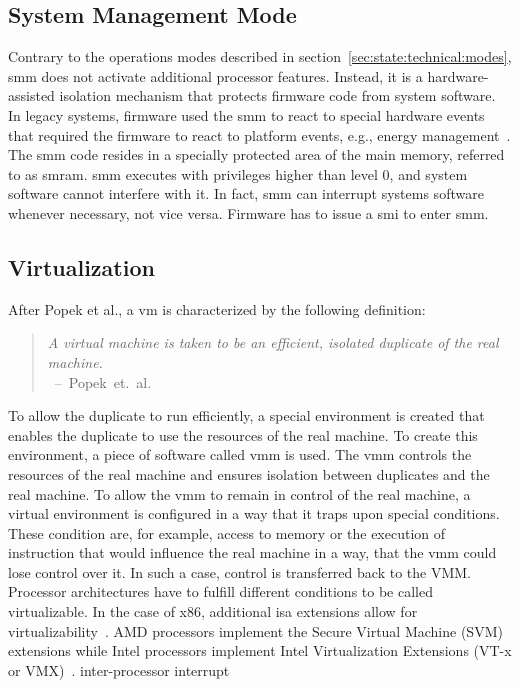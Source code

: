 \subsection{System Management Mode}
\label{sec:state:technical:smm}
Contrary to the operations modes described in
section~\ref{sec:state:technical:modes}, \gls{smm} does not activate additional
processor features. Instead, it is a hardware-assisted isolation mechanism that
protects firmware code from system software. In legacy systems, firmware used
the \gls{smm} to react to special hardware events that required the firmware to
react to platform events, e.g., energy management~\cite{intel_sdm}. The
\gls{smm} code resides in a specially protected area of the main memory,
referred to as \gls{smram}. \gls{smm} executes with privileges higher than level
0, and system software cannot interfere with it. In fact, \gls{smm} can
interrupt systems software whenever necessary, not vice versa. Firmware has to
issue a \gls{smi} to enter \gls{smm}.

\subsection{Virtualization}
\label{sec:state:technical:virt}
After Popek et al., a \gls{vm} is characterized by the following
definition:
\begin{quote}
  \textit{ A virtual machine is taken to be an efficient, isolated duplicate of
    the real machine. \\
  } \mbox{ -- Popek et. al. ~\cite{popek1974formal}}
\end{quote}
To allow the duplicate to run efficiently, a special environment is created that
enables the duplicate to use the resources of the real machine. To create this
environment, a piece of software called  \gls{vmm} is used. The \gls{vmm}
controls the resources of the real machine and ensures isolation between
duplicates and the real machine. To allow the \gls{vmm} to remain in control of
the real machine, a virtual environment is configured in a way that it traps
upon special conditions. These condition are, for example, access to memory or
the execution of instruction that would influence the real machine in a way,
that the \gls{vmm} could lose control over it. In such a case, control is
transferred back to the VMM. Processor architectures have to fulfill different
conditions to be called virtualizable. In the case of x86, additional \gls{isa}
extensions allow for virtualizability~\cite {adams2006comparison}. AMD
processors implement the Secure Virtual Machine (SVM) extensions while Intel
processors implement Intel Virtualization Extensions (VT-x or
VMX)~\cite{amd_manual, intel_sdm}.
inter-processor interrupt
